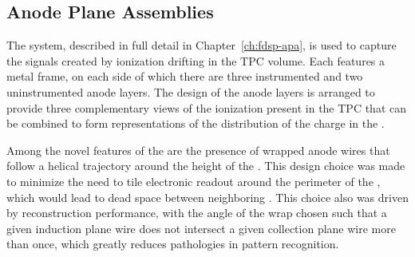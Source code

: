 

\subsection{Anode Plane Assemblies}
\label{sec:fdsp-ov-apa}

The  system, described in full detail in Chapter~\ref{ch:fdsp-apa}, is used to capture the signals created by ionization drifting in the TPC volume.  Each  features a metal frame, on each side of which there are three instrumented and two uninstrumented anode layers.  The design of the anode layers is arranged to provide three complementary views of the ionization present in the TPC that can be combined to form \threed representations of the distribution of the charge in the .  

Among the novel features of the \single \lartpc are the presence of wrapped anode wires that follow a helical trajectory around the height of the .  This design choice was made to minimize the need to tile electronic readout around the perimeter of the , which would lead to dead space between neighboring .  This choice also was driven by reconstruction performance, with the angle of the wrap chosen such that a given induction plane wire does not intersect a given collection plane wire more than once, which greatly reduces pathologies in pattern recognition. 


